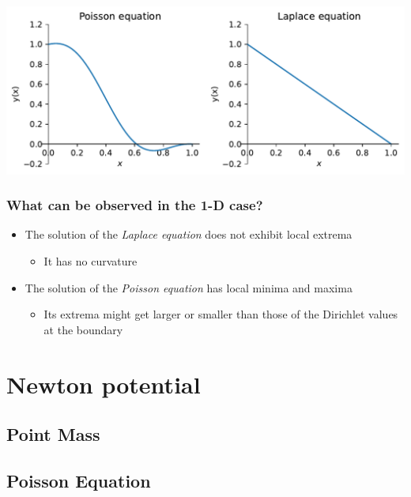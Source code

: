 \documentclass[
  a4paper,
  DIV=11,
  numbers=noendperiod]{scrreprt}
\providecommand{\tightlist}{%
  \setlength{\itemsep}{0pt}\setlength{\parskip}{0pt}}\usepackage{longtable,booktabs,array}
\begin{document}
\includegraphics{fields_files/figure-pdf/cell-2-output-1.pdf}

\section{What can be observed in the 1-D
case?}\label{what-can-be-observed-in-the-1-d-case}

\begin{itemize}
\tightlist
\item
  The solution of the \emph{Laplace equation} does not exhibit local
  extrema

  \begin{itemize}
  \tightlist
  \item
    It has no curvature
  \end{itemize}
\item
  The solution of the \emph{Poisson equation} has local minima and
  maxima

  \begin{itemize}
  \tightlist
  \item
    Its extrema might get larger or smaller than those of the Dirichlet
    values at the boundary
  \end{itemize}
\end{itemize}

\part{Newton potential}

\chapter{Point Mass}\label{point-mass}

\chapter{Poisson Equation}\label{poisson-equation}
\end{document}
